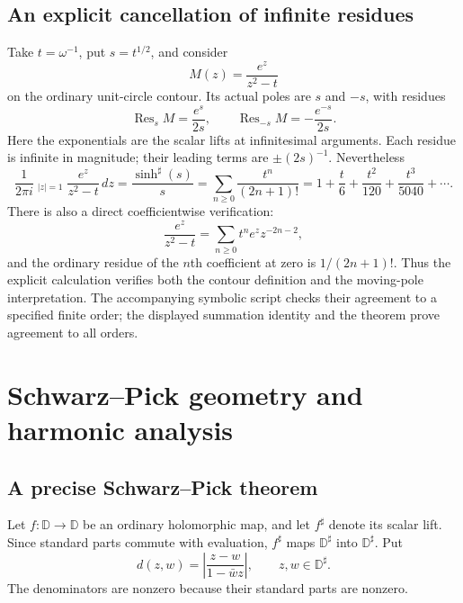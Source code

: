 \documentclass[11pt,letterpaper]{article}
\theoremstyle{definition}
\theoremstyle{remark}
\newcommand{\DD}{\mathbb D}
\newcommand{\res}{\operatorname{Res}}
\newcommand{\HCoint}{\mathop{\oint^{\!H}}\nolimits}
\newcommand{\sh}{^{\sharp}}
\numberwithin{equation}{section}
\begin{document}
\subsection{An explicit cancellation of infinite residues}\label{sec:residueexample}
Take $t=\omega^{-1}$, put $s=t^{1/2}$, and consider
\[
 M(z)=\frac{e^z}{z^2-t}
\]
on the ordinary unit-circle contour. Its actual poles are $s$ and $-s$, with residues
\[
 \res_s M=\frac{e^{s}}{2s},\qquad
 \res_{-s}M=-\frac{e^{-s}}{2s}.
\]
Here the exponentials are the scalar lifts at infinitesimal arguments. Each residue is infinite in magnitude; their leading terms are $\pm(2s)^{-1}$. Nevertheless
\begin{equation}\label{eq:residueexample}
 \frac1{2\pi i}\HCoint_{|z|=1}\frac{e^z}{z^2-t}\,dz
 =\frac{\sinh\sh(s)}s
 =\sum_{n\ge0}\frac{t^n}{(2n+1)!}
 =1+\frac t6+\frac{t^2}{120}+\frac{t^3}{5040}+\cdots.
\end{equation}
There is also a direct coefficientwise verification:
\[
 \frac{e^z}{z^2-t}=\sum_{n\ge0}t^n e^zz^{-2n-2},
\]
and the ordinary residue of the $n$th coefficient at zero is $1/(2n+1)!$. Thus the explicit calculation verifies both the contour definition and the moving-pole interpretation. The accompanying symbolic script checks their agreement to a specified finite order; the displayed summation identity and the theorem prove agreement to all orders.

\section{Schwarz--Pick geometry and harmonic analysis}\label{sec:geometry}
\subsection{A precise Schwarz--Pick theorem}
Let $f:\DD\to\DD$ be an ordinary holomorphic map, and let $f\sh$ denote its scalar lift. Since standard parts commute with evaluation, $f\sh$ maps $\DD\sh$ into $\DD\sh$. Put
\[
 d(z,w)=\left|\frac{z-w}{1-\bar w z}\right|,
 \qquad z,w\in\DD\sh.
\]
The denominators are nonzero because their standard parts are nonzero.
\end{document}
